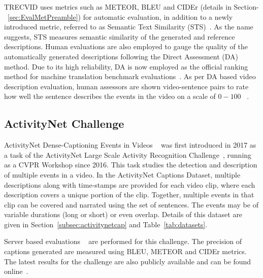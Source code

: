 \documentclass[10pt,journal,compsoc]{IEEEtran}
\begin{document}
TRECVID uses metrics such as METEOR, BLEU and  CIDEr (details in Section-~\ref{sec:EvalMetPreamble}) for automatic evaluation, in addition to a newly introduced metric, referred to as Semantic Text Similarity (STS)~\cite{han2013umbc_ebiquity}. As the name suggests, STS measures semantic similarity of the generated and reference descriptions. Human evaluations are also employed to gauge the quality of the automatically generated descriptions following the Direct Assessment (DA) \cite{graham2017can} method. 
Due to its high reliability, DA is now employed as %
the official ranking method for machine translation benchmark evaluations~\cite{bojar2017findings}. As per DA based video description evaluation, human assessors are shown video-sentence pairs to rate how well the sentence describes the events in the video on a scale of ${0-100}$~ \cite{graham2017evaluation}. 

\subsection{ActivityNet Challenge}
ActivityNet Dense-Captioning Events in Videos ~\cite{activitynetcaptions} was first introduced in 2017 as a task of the ActivityNet Large Scale Activity Recognition Challenge~\cite{activitynethome, ghanem2017activitynet}, running as a CVPR Workshop since 2016. This task studies the detection and description of multiple events in a video. In the ActivityNet Captions Dataset, multiple descriptions along with time-stamps are provided for each video clip, where each description covers a unique portion of the clip.  Together, multiple events in that clip can be covered and narrated using the set of sentences. The events may be of variable durations (long or short) or even overlap. Details of this dataset are given in Section~\ref{subsec:activitynetcap} and Table~\ref{tab:datasets}.

Server based evaluations ~\cite{activitynetcaptionsevaluations} are performed for this challenge. The precision of captions generated are measured using BLEU, METEOR and CIDEr metrics. The latest results for the challenge are also publicly available and can be found online~\cite{activitynetcaptionsresults}. 

\end{document}
